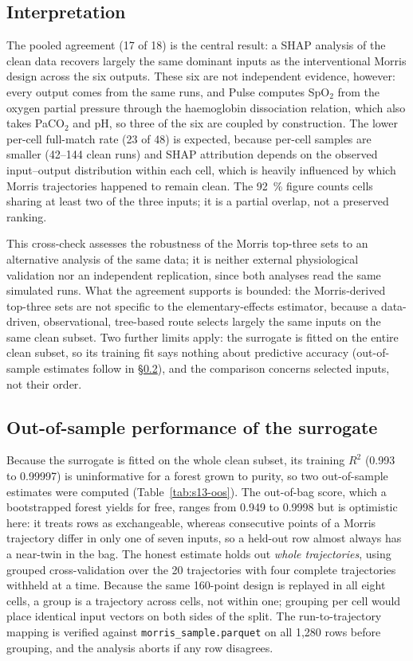 \documentclass[pdflatex,sn-nature]{sn-jnl}%
\begin{document}
\subsection{Interpretation}\label{sec:s13-interp}

The pooled agreement (17 of 18) is the central result: a SHAP analysis of the clean data recovers largely the same dominant inputs as the interventional Morris design across the six outputs. These six are not independent evidence, however: every output comes from the same runs, and Pulse computes SpO$_2$ from the oxygen partial pressure through the haemoglobin dissociation relation, which also takes PaCO$_2$ and pH, so three of the six are coupled by construction. The lower per-cell full-match rate (23 of 48) is expected, because per-cell samples are smaller (42--144 clean runs) and SHAP attribution depends on the observed input--output distribution within each cell, which is heavily influenced by which Morris trajectories happened to remain clean. The 92~\% figure counts cells sharing at least two of the three inputs; it is a partial overlap, not a preserved ranking.

This cross-check assesses the robustness of the Morris top-three sets to an alternative analysis of the same data; it is neither external physiological validation nor an independent replication, since both analyses read the same simulated runs. What the agreement supports is bounded: the Morris-derived top-three sets are not specific to the elementary-effects estimator, because a data-driven, observational, tree-based route selects largely the same inputs on the same clean subset. Two further limits apply: the surrogate is fitted on the entire clean subset, so its training fit says nothing about predictive accuracy (out-of-sample estimates follow in \S\ref{sec:s13-oos}), and the comparison concerns selected inputs, not their order.

\subsection{Out-of-sample performance of the surrogate}\label{sec:s13-oos}

Because the surrogate is fitted on the whole clean subset, its training $R^{2}$ (0.993 to 0.99997) is uninformative for a forest grown to purity, so two out-of-sample estimates were computed (Table~\ref{tab:s13-oos}). The out-of-bag score, which a bootstrapped forest yields for free, ranges from 0.949 to 0.9998 but is optimistic here: it treats rows as exchangeable, whereas consecutive points of a Morris trajectory differ in only one of seven inputs, so a held-out row almost always has a near-twin in the bag. The honest estimate holds out \emph{whole trajectories}, using grouped cross-validation over the 20 trajectories with four complete trajectories withheld at a time. Because the same 160-point design is replayed in all eight cells, a group is a trajectory across cells, not within one; grouping per cell would place identical input vectors on both sides of the split. The run-to-trajectory mapping is verified against \texttt{morris\_sample.parquet} on all 1{,}280 rows before grouping, and the analysis aborts if any row disagrees.
\end{document}

